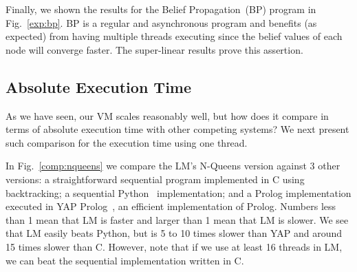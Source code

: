Finally, we shown the results for the Belief Propagation~(BP) program in Fig.~\ref{exp:bp}. BP is a regular and asynchronous program
and benefits (as expected) from having multiple threads executing since the belief values of each node will converge faster.
The super-linear results prove this assertion.

\subsection{Absolute Execution Time}

As we have seen, our VM scales reasonably well, but how does it compare in terms of absolute execution time
with other competing systems? We next present such comparison for the execution time using one thread.

In Fig.~\ref{comp:nqueens} we compare the LM's N-Queens version against 3 other versions: a straightforward sequential program implemented
in C using backtracking; a sequential Python~\cite{vanRossum:1995:PRM}
implementation; and a Prolog implementation executed in
YAP Prolog~\cite{DBLP:journals/corr/abs-1102-3896}, an efficient implementation of Prolog. Numbers less than 1 mean that LM
is faster and larger than 1 mean that LM is slower. We see that LM easily beats Python, but is 5 to 10 times slower than YAP
and around 15 times slower than C.
However, note that if we use at least 16 threads in LM, we can beat the sequential implementation written in C.

